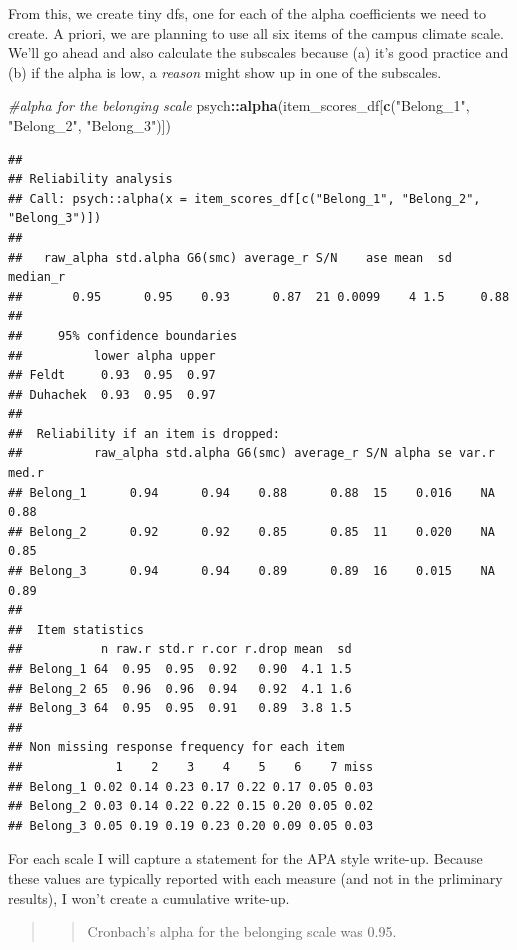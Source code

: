 \documentclass[
  11pt,
]{book}
\newenvironment{Shaded}{\begin{snugshade}}{\end{snugshade}}
\newcommand{\CommentTok}[1]{\textcolor[rgb]{0.37,0.37,0.37}{\textit{#1}}}
\newcommand{\FunctionTok}[1]{\textcolor[rgb]{0.27,0.27,0.27}{\textbf{#1}}}
\newcommand{\NormalTok}[1]{#1}
\newcommand{\SpecialCharTok}[1]{\textcolor[rgb]{0.43,0.43,0.43}{\textbf{#1}}}
\newcommand{\StringTok}[1]{\textcolor[rgb]{0.5,0.5,0.5}{#1}}
\begin{document}
From this, we create tiny dfs, one for each of the alpha coefficients we need to create. A priori, we are planning to use all six items of the campus climate scale. We'll go ahead and also calculate the subscales because (a) it's good practice and (b) if the alpha is low, a \emph{reason} might show up in one of the subscales.

\begin{Shaded}
\begin{Highlighting}[]
\CommentTok{\#alpha for the belonging scale}
\NormalTok{psych}\SpecialCharTok{::}\FunctionTok{alpha}\NormalTok{(item\_scores\_df[}\FunctionTok{c}\NormalTok{(}\StringTok{"Belong\_1"}\NormalTok{, }\StringTok{"Belong\_2"}\NormalTok{, }\StringTok{"Belong\_3"}\NormalTok{)])}
\end{Highlighting}
\end{Shaded}

\begin{verbatim}
## 
## Reliability analysis   
## Call: psych::alpha(x = item_scores_df[c("Belong_1", "Belong_2", "Belong_3")])
## 
##   raw_alpha std.alpha G6(smc) average_r S/N    ase mean  sd median_r
##       0.95      0.95    0.93      0.87  21 0.0099    4 1.5     0.88
## 
##     95% confidence boundaries 
##          lower alpha upper
## Feldt     0.93  0.95  0.97
## Duhachek  0.93  0.95  0.97
## 
##  Reliability if an item is dropped:
##          raw_alpha std.alpha G6(smc) average_r S/N alpha se var.r med.r
## Belong_1      0.94      0.94    0.88      0.88  15    0.016    NA  0.88
## Belong_2      0.92      0.92    0.85      0.85  11    0.020    NA  0.85
## Belong_3      0.94      0.94    0.89      0.89  16    0.015    NA  0.89
## 
##  Item statistics 
##           n raw.r std.r r.cor r.drop mean  sd
## Belong_1 64  0.95  0.95  0.92   0.90  4.1 1.5
## Belong_2 65  0.96  0.96  0.94   0.92  4.1 1.6
## Belong_3 64  0.95  0.95  0.91   0.89  3.8 1.5
## 
## Non missing response frequency for each item
##             1    2    3    4    5    6    7 miss
## Belong_1 0.02 0.14 0.23 0.17 0.22 0.17 0.05 0.03
## Belong_2 0.03 0.14 0.22 0.22 0.15 0.20 0.05 0.02
## Belong_3 0.05 0.19 0.19 0.23 0.20 0.09 0.05 0.03
\end{verbatim}

For each scale I will capture a statement for the APA style write-up. Because these values are typically reported with each measure (and not in the prliminary results), I won't create a cumulative write-up.

\begin{quote}
\begin{quote}
Cronbach's alpha for the belonging scale was 0.95.
\end{quote}
\end{quote}
\end{document}
